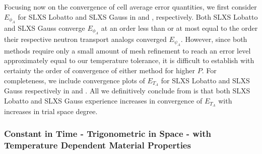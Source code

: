 Focusing now on the convergence of cell average error quantities, we first consider $E_{\phi_A}$ for SLXS Lobatto and SLXS Gauss in  and , respectively.
Both SLXS Lobatto and SLXS Gauss converge $E_{\phi_A}$ at an order less than or at most equal to the order their respective neutron transport analogs converged $E_{\psi_A}$.
However, since both methods require only a small amount of mesh refinement to reach an error level approximately equal to our temperature tolerance, it is difficult to establish with certainty the order of convergence of either method for higher $P$.
For completeness, we include convergence plots of $E_{T_A}$ for SLXS Lobatto and SLXS Gauss respectively in  and .
All we definitively conclude from  is that both SLXS Lobatto and SLXS Gauss experience increases in convergence of $E_{T_A}$ with increases in trial space degree.

\subsubsection{Constant in Time - Trigonometric in Space - with Temperature Dependent Material Properties}

